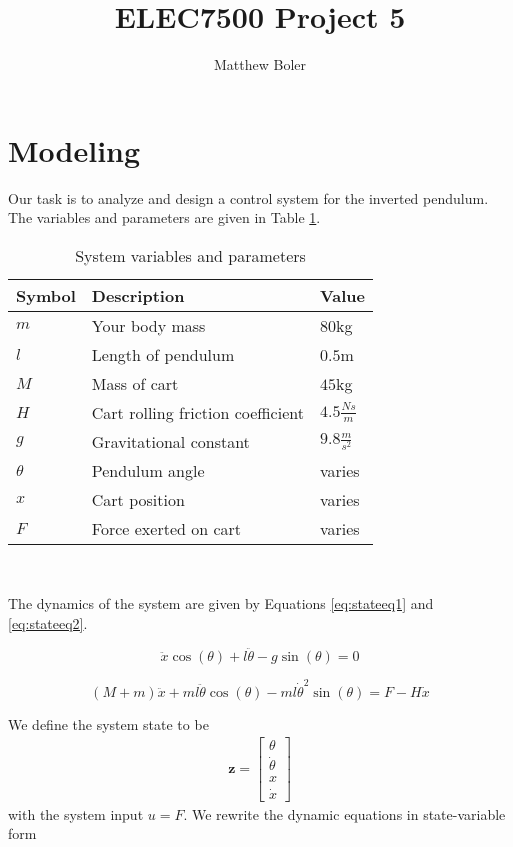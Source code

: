 \documentclass[]{article}
\title{ELEC7500 Project 5}
\author{Matthew Boler}
\begin{document}
\maketitle

\section{Modeling}

Our task is to analyze and design a control system for the inverted pendulum.
The variables and parameters are given in Table \ref{table:variables}.

\begin{table}[h]
\begin{center}
	\begin{tabular}{| l | l | l |}
		\hline
		Symbol & Description & Value \\
		\hline
		$m$ & Your body mass & $80$kg \\
		$l$ & Length of pendulum & $0.5$m \\
		$M$ & Mass of cart & $45$kg \\
		$H$ & Cart rolling friction coefficient & $4.5\frac{Ns}{m}$ \\
		$g$ & Gravitational constant & $9.8\frac{m}{s^2}$ \\
		$\theta$ & Pendulum angle & varies \\
		$x$ & Cart position & varies \\
		$F$ & Force exerted on cart & varies\\
		\hline
	\end{tabular} \\

\end{center}
\caption{System variables and parameters}
\label{table:variables}
\end{table}

The dynamics of the system are given by Equations \ref{eq:stateeq1} and \ref{eq:stateeq2}.

\begin{equation}
	\ddot{x} \cos(\theta) + l\ddot{\theta} - g\sin(\theta) = 0 \label{eq:stateeq1}
\end{equation}

\begin{equation}
	(M + m)\ddot{x} + ml\ddot{\theta}\cos(\theta) - ml\dot{\theta}^2\sin(\theta) = F - H\dot{x} \label{eq:stateeq2}
\end{equation}

We define the system state to be 
\begin{align*}
\textbf{z} = \begin{bmatrix}
\theta \\
\dot{\theta} \\
x \\
\dot{x}
\end{bmatrix}
\end{align*}
with the system input $u = F$. We rewrite the dynamic equations in state-variable form
\end{document}
